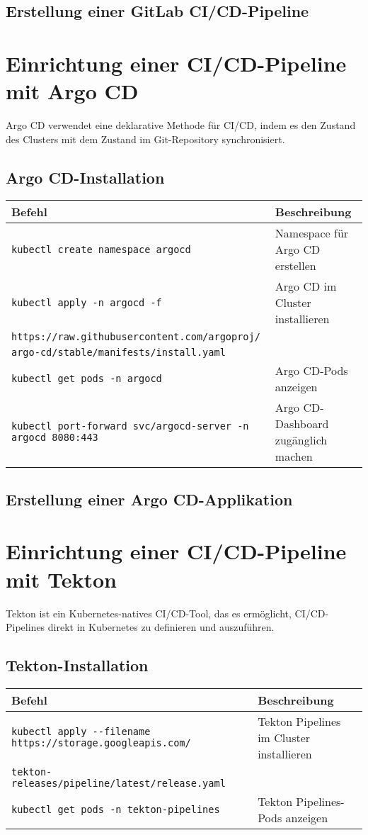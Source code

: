 \subsection{Erstellung einer GitLab CI/CD-Pipeline}
\noindent


\section{Einrichtung einer CI/CD-Pipeline mit Argo CD}
Argo CD verwendet eine deklarative Methode für CI/CD, indem es den Zustand des Clusters mit dem Zustand im Git-Repository synchronisiert.

\subsection{Argo CD-Installation}
\noindent
\begin{tabular}{|p{}|p{}|}
\hline
\textbf{Befehl} & \textbf{Beschreibung} \\
\hline
\texttt{kubectl create namespace argocd} & Namespace für Argo CD erstellen \\
\texttt{kubectl apply -n argocd -f} & Argo CD im Cluster installieren \\
\texttt{https://raw.githubusercontent.com/argoproj/}& \\
\texttt{argo-cd/stable/manifests/install.yaml}& \\
\texttt{kubectl get pods -n argocd} & Argo CD-Pods anzeigen \\
\texttt{kubectl port-forward svc/argocd-server -n argocd 8080:443} & Argo CD-Dashboard zugänglich machen \\
\hline
\end{tabular}
\newpage
\subsection{Erstellung einer Argo CD-Applikation}


\section{Einrichtung einer CI/CD-Pipeline mit Tekton}
Tekton ist ein Kubernetes-natives CI/CD-Tool, das es ermöglicht, CI/CD-Pipelines direkt in Kubernetes zu definieren und auszuführen.

\subsection{Tekton-Installation}
\noindent
\begin{tabular}{|p{}|p{}|}
\hline
\textbf{Befehl} & \textbf{Beschreibung} \\
\hline
\texttt{kubectl apply {-}{-}filename https://storage.googleapis.com/} & Tekton Pipelines im Cluster installieren \\
\texttt{tekton-releases/pipeline/latest/release.yaml} & \\
\texttt{kubectl get pods -n tekton-pipelines} & Tekton Pipelines-Pods anzeigen \\
\hline
\end{tabular}

